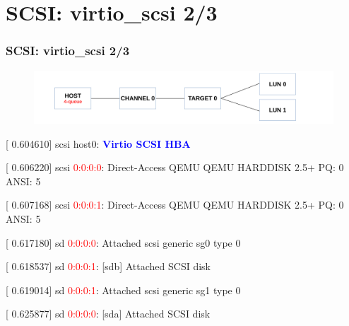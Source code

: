 \documentclass[aspectratio=169]{beamer}
\begin{document}
\section{SCSI: virtio\_scsi 2/3}
\begin{frame}
\frametitle{SCSI: virtio\_scsi 2/3}
\begin{figure}
\includegraphics[width=1.0\linewidth]{figures/virtscsi.pdf}
\end{figure}
\begin{block}{}
[    0.604610] scsi host0: \textbf{\textcolor{blue}{Virtio SCSI HBA}}

[    0.606220] scsi \textcolor{red}{0:0:0:0}: Direct-Access     QEMU     QEMU HARDDISK    2.5+ PQ: 0 ANSI: 5

[    0.607168] scsi \textcolor{red}{0:0:0:1}: Direct-Access     QEMU     QEMU HARDDISK    2.5+ PQ: 0 ANSI: 5

[    0.617180] sd \textcolor{red}{0:0:0:0}: Attached scsi generic sg0 type 0

[    0.618537] sd \textcolor{red}{0:0:0:1}: [sdb] Attached SCSI disk

[    0.619014] sd \textcolor{red}{0:0:0:1}: Attached scsi generic sg1 type 0

[    0.625877] sd \textcolor{red}{0:0:0:0}: [sda] Attached SCSI disk
\end{block}
\end{frame}

\end{document}
